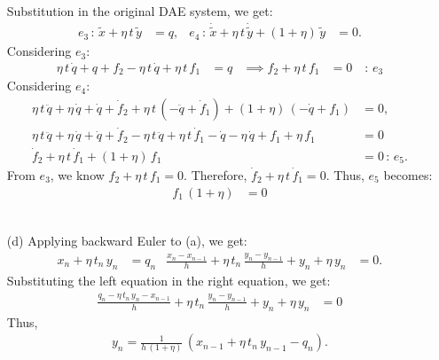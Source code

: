 \begin{enumerate}
	Substitution in the original DAE system, we get:
	\begin{align*}
		e_3\,:\,\tilde x + \eta\,t\,\tilde y &= q, & e_4\,:\,\dot{\tilde x} + \eta\,t\,\dot{\tilde y} + \left(1 + \eta\right)\,\tilde y &= 0.
	\end{align*}
	Considering $e_3$:
	\begin{align*}
		\eta\,t\,\dot q + q + f_2 - \eta\,t\,\dot q + \eta\,t\,f_1 &= q & \implies f_2 + \eta\,t\,f_1 &= 0 \quad :\,e_3
	\end{align*}
	Considering $e_4$:	
	\begin{align*}
		\eta\,t\,\ddot q + \eta\,\dot q + \dot q + \dot f_2 + \eta\,t\,(-\ddot q + \dot f_1) + \left(1 + \eta\right)\,(-\dot q + f_1) &= 0, \\
		\eta\,t\,\ddot q + \eta\,\dot q + \dot q + \dot f_2 - \eta\,t\,\ddot q + \eta\,t\,\dot f_1 - \dot q - \eta\,\dot q + f_1 + \eta\,f_1 &= 0\\
		\dot f_2 + \eta\,t\,\dot f_1 + \left(1 + \eta\right)\,f_1 &= 0\,:\,e_5.
	\end{align*}	
	From $e_3$, we know $f_2 + \eta\,t\,f_1 = 0 $. Therefore, $\dot f_2 + \eta\,t\,\dot f_1 = 0 $. Thus, $e_5$ becomes:
	\begin{align*}
		f_1\,\left(1+\eta\right) &= 0
	\end{align*}
	\\
	\item[(d)] Applying backward Euler to (a), we get: 
	\begin{align*}
		x_n + \eta\,t_n\,y_n &= q_n & \frac{x_n - x_{n-1}}{h} + \eta\,t_n\,\frac{y_n - y_{n-1}}{h} + y_n + \eta\,y_n &= 0.
	\end{align*}
	Substituting the left equation in the right equation, we get:
	\begin{align*}
		\frac{q_n - \eta\,t_n\,y_n - x_{n-1}}{h} + \eta\,t_n\,\frac{y_n - y_{n-1}}{h} + y_n + \eta\,y_n &= 0
	\end{align*}
	Thus,
	\begin{align*}
		y_n = \frac{1}{h\,\left(1 + \eta\right)}\,\left(x_{n-1} + \eta\,t_n\,y_{n-1} - q_n\right).

\end{align*}
\end{enumerate}
